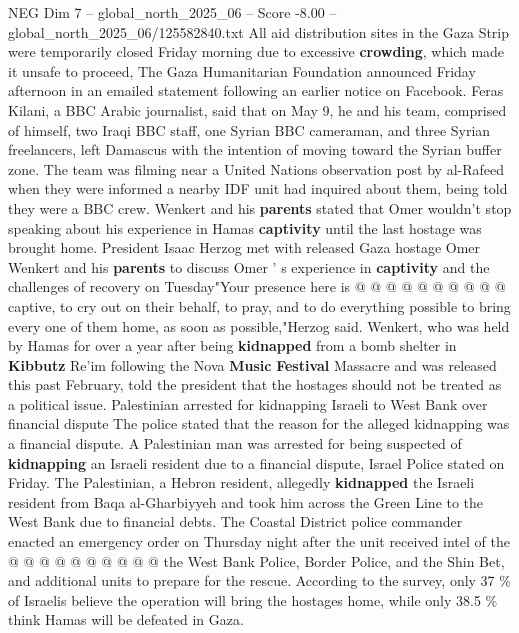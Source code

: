 \begin{textsample}{NEG Dim 7 – global\_north\_2025\_06 – Score -8.00 – global\_north\_2025\_06/125582840.txt}  \label{ex:f7_neg_078}
All aid distribution sites in the Gaza Strip were temporarily closed Friday morning due to excessive \textbf{crowding}, which made it unsafe to proceed, The Gaza Humanitarian Foundation announced Friday afternoon in an emailed statement following an earlier notice on Facebook.
Feras Kilani, a BBC Arabic journalist, said that on May 9, he and his team, comprised of himself, two Iraqi BBC staff, one Syrian BBC cameraman, and three Syrian freelancers, left Damascus with the intention of moving toward the Syrian buffer zone.
The team was filming near a United Nations observation post by al-Rafeed when they were informed a nearby IDF unit had inquired about them, being told they were a BBC crew.
Wenkert and his \textbf{parents} stated that Omer wouldn't stop speaking about his experience in Hamas \textbf{captivity} until the last hostage was brought home.
President Isaac Herzog met with released Gaza hostage Omer Wenkert and his \textbf{parents} to discuss Omer ' s experience in \textbf{captivity} and the challenges of recovery on Tuesday"Your presence here is @ @ @ @ @ @ @ @ @ @ captive, to cry out on their behalf, to pray, and to do everything possible to bring every one of them home, as soon as possible,"Herzog said.
Wenkert, who was held by Hamas for over a year after being \textbf{kidnapped} from a bomb shelter in \textbf{Kibbutz} Re'im following the Nova \textbf{Music} \textbf{Festival} Massacre and was released this past February, told the president that the hostages should not be treated as a political issue.
Palestinian arrested for kidnapping Israeli to West Bank over financial dispute The police stated that the reason for the alleged kidnapping was a financial dispute.
A Palestinian man was arrested for being suspected of \textbf{kidnapping} an Israeli resident due to a financial dispute, Israel Police stated on Friday.
The Palestinian, a Hebron resident, allegedly \textbf{kidnapped} the Israeli resident from Baqa al-Gharbiyyeh and took him across the Green Line to the West Bank due to financial debts.
The Coastal District police commander enacted an emergency order on Thursday night after the unit received intel of the @ @ @ @ @ @ @ @ @ @ the West Bank Police, Border Police, and the Shin Bet, and additional units to prepare for the rescue.
According to the survey, only 37 \% of Israelis believe the operation will bring the hostages home, while only 38.5 \% think Hamas will be defeated in Gaza.

\end{textsample}
